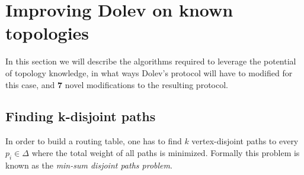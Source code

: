 




\section{Improving Dolev on known topologies}
\label{contr-dolev}
In this section we will describe the algorithms required to leverage the potential of topology knowledge, in what ways Dolev's protocol will have to modified for this case, and \textbf{7} novel modifications to the resulting protocol.

\subsection{Finding k-disjoint paths}
In order to build a routing table, one has to find $k$ vertex-disjoint paths to every $p_i \in \Delta$ where the total weight of all paths is minimized. Formally this problem is known as the \textit{min-sum disjoint paths problem}.

